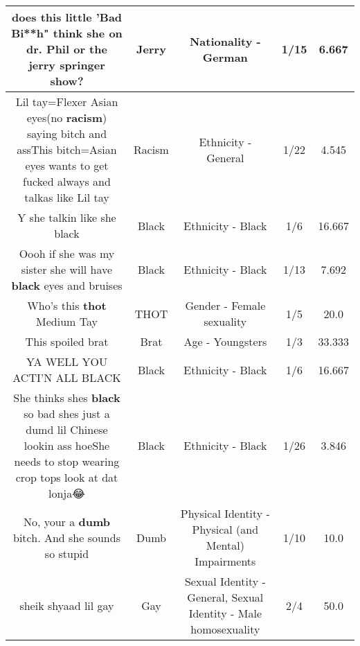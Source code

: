 \documentclass[11pt]{article}
\newlength\mylength
\begin{document}
\begin{center}
\begin{longtable}{|C{.65\mylength}|C{.30\mylength}|C{.12\mylength}|C{.12\mylength}|C{.12\mylength}|}
  \small does this little 'Bad Bi**h" think she on dr. Phil or the \textbf{jerry} springer show?\normalsize   & Jerry & Nationality - German & 1/15 & 6.667 \\  \hline
  \small Lil tay=Flexer Asian eyes(no \textbf{racism}) saying bitch and assThis bitch=Asian eyes wants to get fucked always and talkas like Lil tay\normalsize   & Racism & Ethnicity - General & 1/22 & 4.545 \\  \hline
  \small Y she talkin like she black\normalsize   & Black & Ethnicity - Black & 1/6 & 16.667 \\  \hline
  \small Oooh if she was my sister she will have \textbf{black} eyes and bruises\normalsize   & Black & Ethnicity - Black & 1/13 & 7.692 \\  \hline
  \small Who's this \textbf{thot} Medium Tay\normalsize   & THOT & Gender - Female sexuality & 1/5 & 20.0 \\  \hline
  \small This spoiled brat\normalsize   & Brat & Age - Youngsters & 1/3 & 33.333 \\  \hline
  \small YA WELL YOU ACTI'N ALL BLACK\normalsize   & Black & Ethnicity - Black & 1/6 & 16.667 \\  \hline
  \small She thinks shes \textbf{black} so bad shes just a dumd lil Chinese lookin ass hoeShe needs to stop wearing crop tops look at dat lonja😂\normalsize   & Black & Ethnicity - Black & 1/26 & 3.846 \\  \hline
  \small No, your a \textbf{dumb} bitch. And she sounds so stupid\normalsize   & Dumb & Physical Identity - Physical (and Mental) Impairments & 1/10 & 10.0 \\  \hline
  \small sheik shyaad lil gay\normalsize   & Gay & Sexual Identity - General, Sexual Identity - Male homosexuality & 2/4 & 50.0 \\  \hline

\end{longtable}
\end{center}
\end{document}
